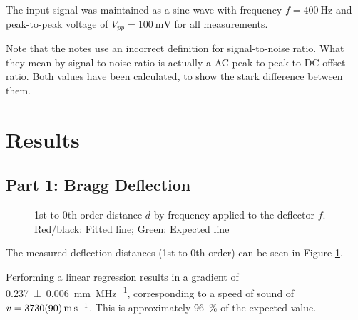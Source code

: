 \documentclass[a4paper]{scrartcl}
\begin{document}
The input signal was maintained as a sine wave with frequency \(f = \SI{400}{\hertz}\) and peak-to-peak voltage of \(V_{pp} = \SI{100}{\milli\volt}\) for all measurements.

Note that the notes use an incorrect definition for signal-to-noise ratio. What they mean by signal-to-noise ratio is actually a AC peak-to-peak to DC offset ratio. Both values have been calculated, to show the stark difference between them.

\section{Results}
\subsection{Part 1: Bragg Deflection}
\begin{figure}
    \centering
    \caption{1st-to-0th order distance \(d\) by frequency applied to the deflector \(f\). Red/black: Fitted line; Green: Expected line}
    \label{fig:part1}
\end{figure}

The measured deflection distances (1st-to-0th order) can be seen in Figure \ref{fig:part1}.

Performing a linear regression results in a gradient of \SI{0.237 \pm 0.006}{\milli\metre\per\mega\hertz}, corresponding to a speed of sound of \(v = \SI{3730 \pm 90}{\metre\per\second}\). This is approximately \SI{96}{\percent} of the expected value.
\end{document}
